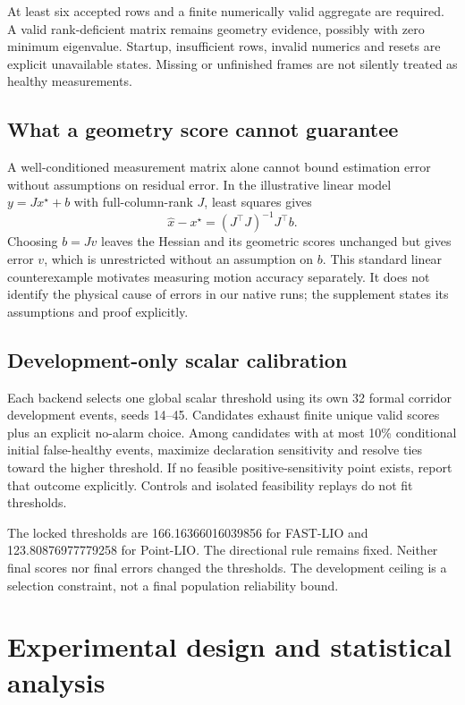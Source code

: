 \documentclass[conference]{IEEEtran}
\begin{document}
At least six accepted rows and a finite numerically valid aggregate are
required. A valid rank-deficient matrix remains geometry evidence, possibly
with zero minimum eigenvalue. Startup, insufficient rows, invalid numerics
and resets are explicit unavailable states. Missing or unfinished frames
are not silently treated as healthy measurements.

\subsection{What a geometry score cannot guarantee}
A well-conditioned measurement matrix alone cannot bound estimation error
without assumptions on residual error. In the illustrative linear model
$y=Jx^\star+b$ with full-column-rank $J$, least squares gives
\begin{equation}
\widehat{x}-x^\star=(J^\top J)^{-1}J^\top b.\label{eq:bias}
\end{equation}
Choosing $b=Jv$ leaves the Hessian and its geometric scores unchanged but
gives error $v$, which is unrestricted without an assumption on $b$.
This standard linear counterexample motivates measuring motion accuracy
separately. It does not identify the physical cause of errors in our native
runs; the supplement states its assumptions and proof explicitly.

\subsection{Development-only scalar calibration}
Each backend selects one global scalar threshold using its own 32 formal
corridor development events, seeds 14--45. Candidates exhaust finite unique
valid scores plus an explicit no-alarm choice. Among candidates with at most
10\% conditional initial false-healthy events, maximize declaration sensitivity
and resolve ties toward the higher threshold. If no feasible positive-sensitivity
point exists, report that outcome explicitly. Controls and isolated feasibility
replays do not fit thresholds.

The locked thresholds are 166.16366016039856 for FAST-LIO and
123.80876977779258 for Point-LIO. The directional rule remains fixed.
Neither final scores nor final errors changed the thresholds. The development
ceiling is a selection constraint, not a final population reliability bound.

\section{Experimental design and statistical analysis}
\end{document}
